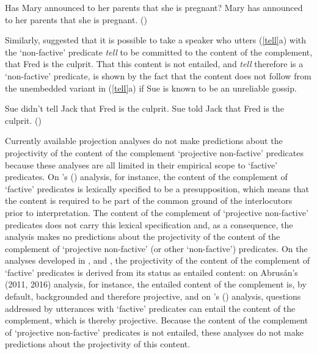 \documentclass[11pt,fleqn]{article}
\newcommand{\6}{\mbox{$[\hspace*{-.6mm}[$}}
\newcommand{\9}{\mbox{$]\hspace*{-.6mm}]$}}
\newcommand{\citetpos}[1]{\citeauthor{#1}'s (\citeyear{#1})}
\begin{document}
\begin{exe}
\ex\label{announce2} 
\begin{xlist}
\ex Has Mary announced to her parents that she is pregnant? 
\ex Mary has announced to her parents that she is pregnant. \hfill (\citealt[139]{schlenker10})
\end{xlist}
\end{exe}
Similarly, \citet{spector-egre2015} suggested that it is possible to take a speaker who utters (\ref{tell}a) with the `non-factive' predicate {\em tell}  to be committed to the content of the complement, that Fred is the culprit. That this content is not entailed, and {\em tell} therefore is a `non-factive' predicate, is shown by the fact that the content does not follow from the unembedded variant in (\ref{tell}a) if Sue is known to be an unreliable gossip.

\begin{exe}
\ex\label{tell}
\begin{xlist}
\ex Sue didn't tell Jack that Fred is the culprit. 
\ex Sue told Jack that Fred is the culprit. \hfill (\citealt[1739]{spector-egre2015})
\end{xlist}
\end{exe}

Currently available projection analyses do not make predictions about the projectivity of the content of the complement `projective non-factive' predicates because these analyses are all limited in their empirical scope to `factive' predicates. On \citetpos{heim83} analysis, for instance, the content of the complement of `factive' predicates is lexically specified to be a presupposition, which means that the content is required to be part of the common ground of the interlocutors prior to interpretation. The content of the complement of `projective non-factive' predicates does not carry this lexical specification and, as a consequence, the analysis makes no predictions about the projectivity of the content of the complement of `projective non-factive' (or other `non-factive') predicates. On the analyses developed in \citealt{abrusan2011,abrusan2016}, \citealt{romoli2015} and \citealt{best-question}, the projectivity of the content of the complement of `factive' predicates is derived from its status as entailed content: on Abrus\'an's (2011, 2016) analysis, for instance, the entailed content of the complement is, by default, backgrounded and therefore projective, and on \citetpos{best-question} analysis, questions addressed by utterances with `factive' predicates can entail the content of the complement, which is thereby projective. Because the content of the complement of  `projective non-factive' predicates is not entailed, these analyses do not make predictions about the projectivity of this content. 
\end{document}
